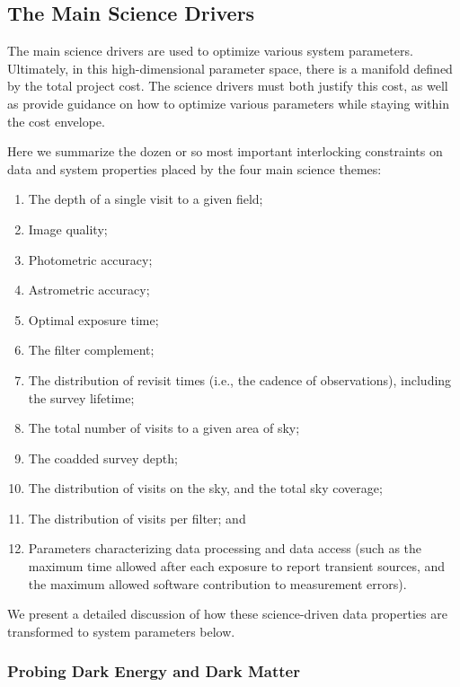 \subsection{The Main Science Drivers }

The main science drivers are used to optimize various system parameters.
Ultimately, in this high-dimensional parameter space, there is a
manifold defined by the total project cost. The science
drivers must both justify this cost, as well as provide guidance
on how to optimize various parameters while staying within the cost envelope.

Here we summarize the dozen or so most important interlocking constraints on data
and system properties placed by the four main science themes:

\begin{enumerate}
\item  The depth of a single visit to a given field;
\item  Image quality;
\item  Photometric accuracy;
\item  Astrometric accuracy;
\item  Optimal exposure time;
\item  The filter complement;
\item  The distribution of revisit times (i.e., the cadence of observations),
                including the survey lifetime;
\item  The total number of visits to a given area of sky;
\item  The coadded survey depth;
\item  The distribution of visits on the sky, and the total sky coverage;
\item  The distribution of visits per filter; and
\item  Parameters characterizing data processing and data access
  (such as the maximum time allowed after each exposure to report
         transient sources, and the maximum allowed software
         contribution to measurement errors).
\end{enumerate}

We present a detailed discussion of how these science-driven data properties are
transformed to system parameters below.


\subsubsection{Probing Dark Energy and Dark Matter}
\label{sec:Dark_Energy}

